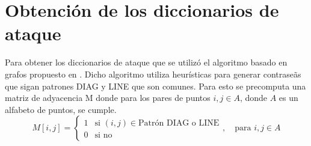 \section{Obtenci\'on de los diccionarios de ataque}
Para obtener los diccionarios de ataque que se utiliz\'o el algoritmo basado en grafos propuesto en \cite{van2010purely}. Dicho algoritmo utiliza heur\'isticas para generar contrase\~as que sigan patrones DIAG y LINE \cite{s22051987} que son comunes. Para esto se precomputa una matriz de adyacencia M donde para los pares de puntos $i,j \in A$, donde $A$ es un alfabeto de puntos, se cumple.
\[
 M[i,j] = 
\begin{cases} 
	1 & \text{si } (i, j) \in \text{Patrón DIAG o LINE} \\
	0 & \text{si no}
\end{cases}
, \quad \text{para } i,j \in A
\] 